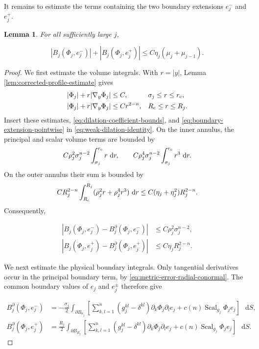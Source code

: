 \documentclass[11pt]{article}
\numberwithin{equation}{section}
\newtheorem{lemma}[theorem]{Lemma}
\theoremstyle{remark}
\newcommand{\dd}{\mathop{}\!\mathrm{d}}
\begin{document}
\par
It remains to estimate the terms containing the two boundary extensions
\(e_j^-\) and \(e_j^+\).

\begin{lemma}\label{lem:boundary-dilation-terms}
For all sufficiently large \(j\),
 
\begin{equation}\label{eq:boundary-dilation-bound}
 | B_j(\Phi_j,e_j^-)|
 +| B_j(\Phi_j,e_j^+)|
 \le C\eta_j(\mu_j+\mu_{j-1}).
\end{equation}

\end{lemma}

\begin{proof}
We first estimate the volume integrals. With \(r=|y|\),
Lemma  \ref{lem:corrected-profile-estimate} gives
\[
 \begin{aligned}
 |\Phi_j|+r|\nabla_y\Phi_j|&\le C,
 &&\sigma_j\le r\le r_{\rm c},\\
 |\Phi_j|+r|\nabla_y\Phi_j|&\le Cr^{2-n},
 &&R_{\rm c}\le r\le R_j.
 \end{aligned}
\]
Insert these estimates, \eqref{eq:dilation-coefficient-bounds}, and
\eqref{eq:boundary-extension-pointwise} in
\eqref{eq:weak-dilation-identity}. On the inner annulus, the principal
and scalar volume terms are bounded by
\[
 C\rho_j^2\sigma_j^{n-2}\int_{\sigma_j}^{r_{\rm c}}r\,\dd r,
 \qquad
 C\rho_j^4\sigma_j^{n-2}\int_{\sigma_j}^{r_{\rm c}}r^3\,\dd r.
\]
On the outer annulus their sum is bounded by
\[
 CR_j^{2-n}\int_{R_{\rm c}}^{R_j}
 (\rho_j^2r+\rho_j^4r^3)\,\dd r
 \le C(\eta_j+\eta_j^2)R_j^{2-n}.
\]
Consequently,
 
\[
 \begin{aligned}
 | B_j(\Phi_j,e_j^-)
 - B_j^\partial(\Phi_j,e_j^-)|
 &\le C\rho_j^2\sigma_j^{n-2},\\
 | B_j(\Phi_j,e_j^+)
 - B_j^\partial(\Phi_j,e_j^+)|
 &\le C\eta_jR_j^{2-n}.
 \end{aligned}
\]

We next estimate the physical boundary integrals. Only tangential
derivatives occur in the principal boundary term,
by \eqref{eq:metric-error-radial-conormal}. The common boundary values
of \(e_j\) and \(e_j^\pm\) therefore give
 
\[
 \begin{aligned}
  B_j^\partial(\Phi_j,e_j^-)
 &=-\frac{\sigma_j}{2}\int_{\partial B_{\sigma_j}}
 \left[
 \sum_{k,l=1}^n(g_j^{kl}-\delta^{kl})
 \partial_k\Phi_j\partial_le_j+c(n)\operatorname{Scal}_{g_j}\Phi_je_j
 \right]\,\dd S,\\
  B_j^\partial(\Phi_j,e_j^+)
 &=\frac{R_j}{2}\int_{\partial B_{R_j}}
 \left[
 \sum_{k,l=1}^n(g_j^{kl}-\delta^{kl})
 \partial_k\Phi_j\partial_le_j+c(n)\operatorname{Scal}_{g_j}\Phi_je_j
 \right]\,\dd S.
 \end{aligned}
\]


\end{proof}
\end{document}

